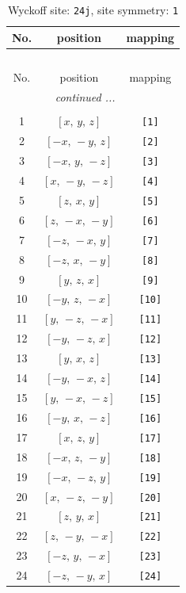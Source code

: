 \documentclass[fleqn,8pt]{jsarticle}
\begin{document}
\begin{longtable}{ccc}
\caption{Wyckoff site: {\tt 24j}, site symmetry: {\tt 1}}
 \\
 \hline \hline
No. & position & mapping \\ \hline \endfirsthead

\multicolumn{2}{l}{\tablename\ \thetable{}} \\
 \hline \hline
No. & position & mapping \\ \hline \endhead

 \hline \hline
\multicolumn{2}{r}{\footnotesize\it continued ...} \\ \endfoot

 \hline \hline
\multicolumn{2}{r}{} \\ \endlastfoot

1 & $\left[ x,\, y,\, z \right]$ & {\tt [1]} \\ \hline
2 & $\left[ - x,\, - y,\, z \right]$ & {\tt [2]} \\ \hline
3 & $\left[ - x,\, y,\, - z \right]$ & {\tt [3]} \\ \hline
4 & $\left[ x,\, - y,\, - z \right]$ & {\tt [4]} \\ \hline
5 & $\left[ z,\, x,\, y \right]$ & {\tt [5]} \\ \hline
6 & $\left[ z,\, - x,\, - y \right]$ & {\tt [6]} \\ \hline
7 & $\left[ - z,\, - x,\, y \right]$ & {\tt [7]} \\ \hline
8 & $\left[ - z,\, x,\, - y \right]$ & {\tt [8]} \\ \hline
9 & $\left[ y,\, z,\, x \right]$ & {\tt [9]} \\ \hline
10 & $\left[ - y,\, z,\, - x \right]$ & {\tt [10]} \\ \hline
11 & $\left[ y,\, - z,\, - x \right]$ & {\tt [11]} \\ \hline
12 & $\left[ - y,\, - z,\, x \right]$ & {\tt [12]} \\ \hline
13 & $\left[ y,\, x,\, z \right]$ & {\tt [13]} \\ \hline
14 & $\left[ - y,\, - x,\, z \right]$ & {\tt [14]} \\ \hline
15 & $\left[ y,\, - x,\, - z \right]$ & {\tt [15]} \\ \hline
16 & $\left[ - y,\, x,\, - z \right]$ & {\tt [16]} \\ \hline
17 & $\left[ x,\, z,\, y \right]$ & {\tt [17]} \\ \hline
18 & $\left[ - x,\, z,\, - y \right]$ & {\tt [18]} \\ \hline
19 & $\left[ - x,\, - z,\, y \right]$ & {\tt [19]} \\ \hline
20 & $\left[ x,\, - z,\, - y \right]$ & {\tt [20]} \\ \hline
21 & $\left[ z,\, y,\, x \right]$ & {\tt [21]} \\ \hline
22 & $\left[ z,\, - y,\, - x \right]$ & {\tt [22]} \\ \hline
23 & $\left[ - z,\, y,\, - x \right]$ & {\tt [23]} \\ \hline
24 & $\left[ - z,\, - y,\, x \right]$ & {\tt [24]} \\
\end{longtable}
\end{document}

